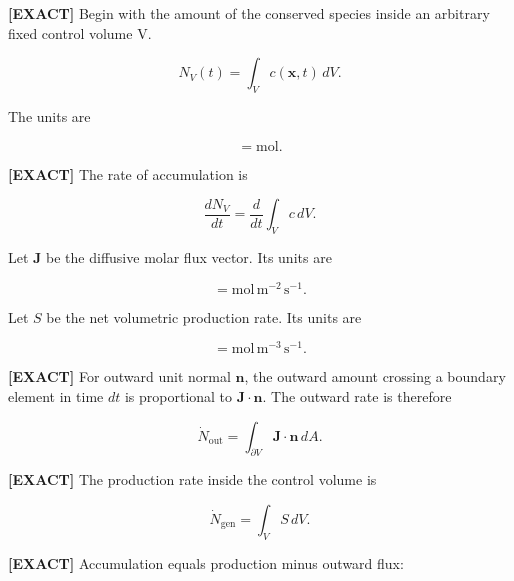 \documentclass[11pt,a4paper]{article}
\begin{document}
\textbf{[EXACT]} Begin with the amount of the conserved species inside an arbitrary fixed control volume V.

\begin{equation}
N_V(t)=\int_V c(\mathbf{x},t)\,dV.
\tag{TRISO-GOV-020}
\label{eq:triso-gov-020}
\end{equation}

The units are

\begin{equation}
[N_V]=\mathrm{mol}.
\tag{TRISO-GOV-021}
\label{eq:triso-gov-021}
\end{equation}

\textbf{[EXACT]} The rate of accumulation is

\begin{equation}
\frac{dN_V}{dt}=\frac{d}{dt}\int_V c\,dV.
\tag{TRISO-GOV-022}
\label{eq:triso-gov-022}
\end{equation}

Let $\mathbf J$ be the diffusive molar flux vector. Its units are

\begin{equation}
[\mathbf J]=\mathrm{mol\,m^{-2}\,s^{-1}}.
\tag{TRISO-GOV-023}
\label{eq:triso-gov-023}
\end{equation}

Let $S$ be the net volumetric production rate. Its units are

\begin{equation}
[S]=\mathrm{mol\,m^{-3}\,s^{-1}}.
\tag{TRISO-GOV-024}
\label{eq:triso-gov-024}
\end{equation}

\textbf{[EXACT]} For outward unit normal $\mathbf n$, the outward amount crossing a boundary element in time $dt$ is proportional to $\mathbf J\cdot\mathbf n$. The outward rate is therefore

\begin{equation}
\dot N_{\mathrm{out}}=\int_{\partial V}\mathbf J\cdot\mathbf n\,dA.
\tag{TRISO-GOV-025}
\label{eq:triso-gov-025}
\end{equation}

\textbf{[EXACT]} The production rate inside the control volume is

\begin{equation}
\dot N_{\mathrm{gen}}=\int_V S\,dV.
\tag{TRISO-GOV-026}
\label{eq:triso-gov-026}
\end{equation}

\textbf{[EXACT]} Accumulation equals production minus outward flux:
\end{document}
